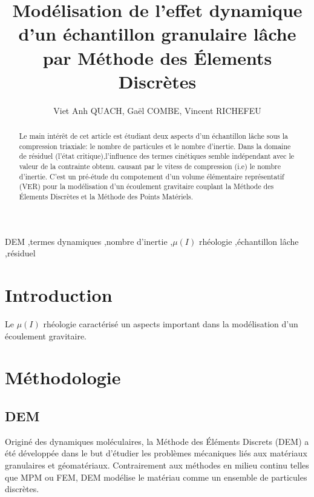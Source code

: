 \documentclass[5p,authoryear,square]{elsarticle}
\begin{document}
\begin{frontmatter}

\title{\textbf{Modélisation de l'effet dynamique d'un échantillon granulaire lâche par Méthode des Élements Discrètes}}

\author{Viet Anh QUACH, Gaël COMBE, Vincent RICHEFEU}
\address{Laboratoire 3SR, Université Grenoble Alpes}


\begin{abstract}
Le main intérêt de cet article est étudiant deux aspects d'un échantillon lâche sous la compression triaxiale: le nombre de particules et le nombre d'inertie. 
Dans la domaine de résiduel (l'état critique),l'influence des termes cinétiques semble indépendant avec le valeur de la contrainte obtenu. causant par le vitess de compression (i.e) le nombre d'inertie.
C'est un pré-étude du compotement d'un volume élémentaire représentatif (VER) pour la modélisation d'un écoulement gravitaire couplant la Méthode des Élements Discrètes et la Méthode des Points Matériels.

\end{abstract}

\begin{keyword}
DEM \sep termes dynamiques \sep nombre d'inertie \sep $\mu(I)$ rhéologie \sep échantillon lâche \sep résiduel
\end{keyword}

\end{frontmatter}

\section{Introduction}\label{introduction}
Le $\mu(I)$ rhéologie caractérisé un aspects important dans la modélisation d'un écoulement gravitaire.  

\section{Méthodologie}\label{methode}

\subsection{DEM}\label{dem}
Originé des dynamiques moléculaires, la Méthode des Éléments Discrets (DEM) a été développée dans le but d'étudier les problèmes mécaniques liés aux matériaux granulaires et géomatériaux. Contrairement aux méthodes en milieu continu telles que MPM ou FEM, DEM modélise le matériau comme un ensemble de particules discrètes.
\end{document}
